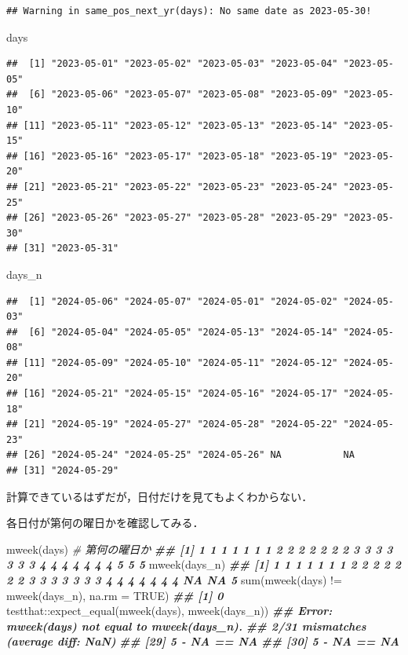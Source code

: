 \documentclass[
]{article}
\newenvironment{Shaded}{\begin{snugshade}}{\end{snugshade}}
\newcommand{\AttributeTok}[1]{\textcolor[rgb]{0.77,0.63,0.00}{#1}}
\newcommand{\CommentTok}[1]{\textcolor[rgb]{0.56,0.35,0.01}{\textit{#1}}}
\newcommand{\ConstantTok}[1]{\textcolor[rgb]{0.00,0.00,0.00}{#1}}
\newcommand{\DocumentationTok}[1]{\textcolor[rgb]{0.56,0.35,0.01}{\textbf{\textit{#1}}}}
\newcommand{\FunctionTok}[1]{\textcolor[rgb]{0.00,0.00,0.00}{#1}}
\newcommand{\NormalTok}[1]{#1}
\newcommand{\SpecialCharTok}[1]{\textcolor[rgb]{0.00,0.00,0.00}{#1}}
\begin{document}
\begin{verbatim}
## Warning in same_pos_next_yr(days): No same date as 2023-05-30!
\end{verbatim}

\begin{Shaded}
\begin{Highlighting}[]
\NormalTok{days}
\end{Highlighting}
\end{Shaded}

\begin{verbatim}
##  [1] "2023-05-01" "2023-05-02" "2023-05-03" "2023-05-04" "2023-05-05"
##  [6] "2023-05-06" "2023-05-07" "2023-05-08" "2023-05-09" "2023-05-10"
## [11] "2023-05-11" "2023-05-12" "2023-05-13" "2023-05-14" "2023-05-15"
## [16] "2023-05-16" "2023-05-17" "2023-05-18" "2023-05-19" "2023-05-20"
## [21] "2023-05-21" "2023-05-22" "2023-05-23" "2023-05-24" "2023-05-25"
## [26] "2023-05-26" "2023-05-27" "2023-05-28" "2023-05-29" "2023-05-30"
## [31] "2023-05-31"
\end{verbatim}

\begin{Shaded}
\begin{Highlighting}[]
\NormalTok{days\_n}
\end{Highlighting}
\end{Shaded}

\begin{verbatim}
##  [1] "2024-05-06" "2024-05-07" "2024-05-01" "2024-05-02" "2024-05-03"
##  [6] "2024-05-04" "2024-05-05" "2024-05-13" "2024-05-14" "2024-05-08"
## [11] "2024-05-09" "2024-05-10" "2024-05-11" "2024-05-12" "2024-05-20"
## [16] "2024-05-21" "2024-05-15" "2024-05-16" "2024-05-17" "2024-05-18"
## [21] "2024-05-19" "2024-05-27" "2024-05-28" "2024-05-22" "2024-05-23"
## [26] "2024-05-24" "2024-05-25" "2024-05-26" NA           NA          
## [31] "2024-05-29"
\end{verbatim}

計算できているはずだが，日付だけを見てもよくわからない．

各日付が第何の曜日かを確認してみる．

\begin{Shaded}
\begin{Highlighting}[]
\FunctionTok{mweek}\NormalTok{(days)   }\CommentTok{\# 第何の曜日か}
\DocumentationTok{\#\# [1] 1 1 1 1 1 1 1 2 2 2 2 2 2 2 3 3 3 3 3 3 3 4 4 4 4 4 4 4 5 5 5}
\FunctionTok{mweek}\NormalTok{(days\_n)}
\DocumentationTok{\#\# [1]  1  1  1  1  1  1  1  2  2  2  2  2  2  2  3  3  3  3  3  3  3  4  4  4  4  4  4  4 NA NA  5}
\FunctionTok{sum}\NormalTok{(}\FunctionTok{mweek}\NormalTok{(days) }\SpecialCharTok{!=} \FunctionTok{mweek}\NormalTok{(days\_n), }\AttributeTok{na.rm =} \ConstantTok{TRUE}\NormalTok{)}
\DocumentationTok{\#\# [1] 0}
\NormalTok{testthat}\SpecialCharTok{::}\FunctionTok{expect\_equal}\NormalTok{(}\FunctionTok{mweek}\NormalTok{(days), }\FunctionTok{mweek}\NormalTok{(days\_n))}
\DocumentationTok{\#\# Error: mweek(days) not equal to mweek(days\_n).}
\DocumentationTok{\#\# 2/31 mismatches (average diff: NaN)}
\DocumentationTok{\#\# [29] 5 {-} NA == NA}
\DocumentationTok{\#\# [30] 5 {-} NA == NA}
\end{Highlighting}
\end{Shaded}
\end{document}
